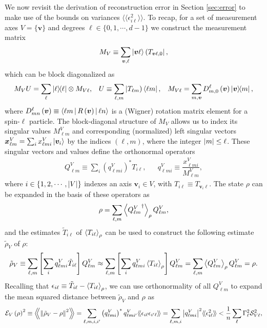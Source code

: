 \documentclass[a4paper,twocolumn,unpublished]{quantumarticle}
\newcommand{\f}[2]{\dfrac{#1}{#2}} %
\newcommand{\p}[1]{\left(#1\right)} %
\renewcommand{\sp}[1]{\left[#1\right]} %
\newcommand{\bk}{\Braket} %
\renewcommand{\set}[1]{\{#1\}} %
\newcommand{\bbk}[1]{\langle\!\langle #1 \rangle\!\rangle}
\newcommand{\Bbk}[1]
{\left\langle\!\!\left\langle #1 \right\rangle\!\!\right\rangle}
\newcommand{\E}{\mathcal{E}}
\renewcommand{\S}{\mathcal{S}}
\def\obra#1{\mathinner{({#1}|}}
\def\oket#1{\mathinner{|{#1})}}
\begin{document}
We now revisit the derivation of reconstruction error in Section \ref{sec:error} to make use of the bounds on variances $\bbk{\epsilon_{i\ell}^2}$.
To recap, for a set of measurement axes $V=\set{\bm v}$ and degrees $\ell\in\set{0,1,\cdots,d-1}$ we construct the measurement matrix
\begin{align}
  M_V \equiv \sum_{\bm v,\ell} \ket{\bm v\ell} \obra{T_{\bm v\ell,0}},
\end{align}
which can be block diagonalized as
\begin{align}
  M_V U = \sum_\ell \op{\ell} \otimes M_{V\ell},
  &&
  U \equiv \sum_{\ell,m} \oket{T_{\ell m}} \bra{\ell m},
  &&
  M_{V\ell} = \sum_{m,\bm v} D^\ell_{m,0}\p{\bm v} \op{\bm v}{m},
\end{align}
where $D^\ell_{mn}\p{\bm v}\equiv\bk{\ell m|R\p{\bm v}|\ell n}$ is a (Wigner) rotation matrix element for a spin-$\ell$ particle.
The block-diagonal structure of $M_V$ allows us to index its singular values $M^V_{\ell m}$ and corresponding (normalized) left singular vectors $\bm x^V_{\ell m} = \sum_i x^V_{\ell m i} \ket{\bm v_i}$ by the indices $\p{\ell,m}$, where the integer $\abs{m}\le\ell$.
These singular vectors and values define the orthonormal operators
\begin{align}
  Q^V_{\ell m} \equiv \sum_i \p{q^V_{\ell mi}}^* T_{i\ell},
  &&
  q^V_{\ell m i} \equiv \f{x^V_{\ell m i}}{M^V_{\ell m}},
\end{align}
where $i\in\set{1,2,\cdots,\abs{V}}$ indexes an axis $\bm v_i\in V$, with $T_{i\ell} \equiv T_{\bm v_i\ell}$.
The state $\rho$ can be expanded in the basis of these operators as
\begin{align}
  \rho = \sum_{\ell,m} \bk{{Q^V_{\ell m}}^\dag}_\rho Q^V_{\ell m},
\end{align}
and the estimates $\tilde T_{i\ell}$ of $\bk{T_{i\ell}}_\rho$ can be used to construct the following estimate $\tilde\rho_V$ of $\rho$:
\begin{align}
  \tilde\rho_V \equiv \sum_{\ell,m}
  \sp{\sum_i q^V_{\ell mi} \tilde T_{i\ell}} Q^V_{\ell m}
  \approx \sum_{\ell,m}
  \sp{\sum_i q^V_{\ell mi} \bk{T_{i\ell}}_\rho} Q^V_{\ell m}
  = \sum_{\ell,m} \bk{Q^V_{\ell m}}_\rho Q^V_{\ell m}
  = \rho.
\end{align}
Recalling that $\epsilon_{i\ell} \equiv \tilde T_{i\ell} - \bk{T_{i\ell}}_\rho$, we can use orthonormality of all $Q^V_{\ell m}$ to expand the mean squared distance between $\tilde\rho_V$ and $\rho$ as
\begin{align}
  \E_V\p{\rho}^2 \equiv \Bbk{\norm{\tilde\rho_V-\rho}^2}
  = \sum_{\ell,m,i,i'} \p{q^V_{\ell mi}}^* q^V_{\ell mi'} \bbk{\epsilon_{i\ell} \epsilon_{i'\ell}}
  = \sum_{\ell,m,i} \abs{q^V_{\ell mi}}^2 \bbk{\epsilon_{i\ell}^2}
  < \f1n \sum_\ell \Gamma_\ell^2 \S_{V\ell}^2,
  \label{eq:bound_apndx}
\end{align}
\end{document}
